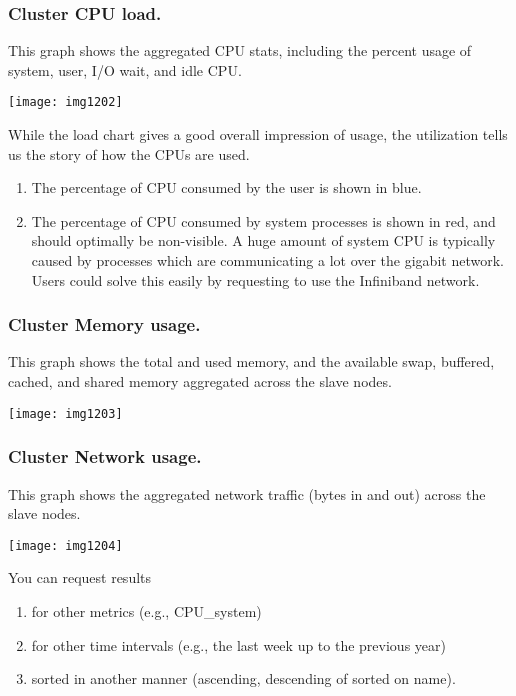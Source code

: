 \subsubsection{Cluster CPU load.}

This graph shows the aggregated CPU stats, including the percent usage of system, user, I/O wait, and idle CPU.

\texttt{[image: img1202]}

While the load chart gives a good overall impression of usage, the utilization tells us the story of how the CPUs are used.

\begin{enumerate}
\item  The percentage of CPU consumed by the user is shown in blue.
\item  The percentage of CPU consumed by system processes is shown in red, and should optimally be non-visible.  A huge amount of system CPU is typically caused by processes which are communicating a lot over the gigabit network. Users could solve this easily by requesting to use the Infiniband network.
\end{enumerate}

\subsubsection{Cluster Memory usage.}

This graph shows the total and used memory, and the available swap, buffered,
cached, and shared memory aggregated across the slave nodes.

\texttt{[image: img1203]}

\subsubsection{Cluster Network usage.}

This graph shows the aggregated network traffic (bytes in and out) across the
slave nodes.

\texttt{[image: img1204]}

You can request results

\begin{enumerate}
\item  for other metrics (e.g., CPU\_system)
\item  for other time intervals (e.g., the last week up to the previous year)
\item  sorted in another manner (ascending, descending of sorted on name).
\end{enumerate}

